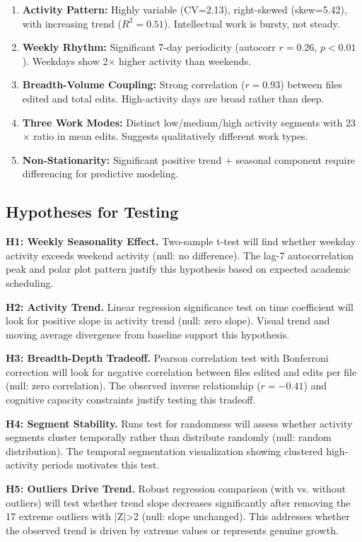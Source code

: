 \documentclass[11pt]{article}
\begin{document}
\begin{enumerate}
    \item \textbf{Activity Pattern:} Highly variable (CV=2.13), right-skewed (skew=5.42), with increasing trend ($R^2=0.51$). Intellectual work is bursty, not steady.
    \item \textbf{Weekly Rhythm:} Significant 7-day periodicity (autocorr $r=0.26$, $p<0.01$). Weekdays show 2$\times$ higher activity than weekends.
    \item \textbf{Breadth-Volume Coupling:} Strong correlation ($r=0.93$) between files edited and total edits. High-activity days are broad rather than deep.
    \item \textbf{Three Work Modes:} Distinct low/medium/high activity segments with 23$\times$ ratio in mean edits. Suggests qualitatively different work types.
    \item \textbf{Non-Stationarity:} Significant positive trend + seasonal component require differencing for predictive modeling.
\end{enumerate}

\subsection{Hypotheses for Testing}

\textbf{H1: Weekly Seasonality Effect.} Two-sample t-test will find whether weekday activity exceeds weekend activity (null: no difference). The lag-7 autocorrelation peak and polar plot pattern justify this hypothesis based on expected academic scheduling.

\textbf{H2: Activity Trend.} Linear regression significance test on time coefficient will look for positive slope in activity trend (null: zero slope). Visual trend and moving average divergence from baseline support this hypothesis.

\textbf{H3: Breadth-Depth Tradeoff.} Pearson correlation test with Bonferroni correction will look for negative correlation between files edited and edits per file (null: zero correlation). The observed inverse relationship ($r=-0.41$) and cognitive capacity constraints justify testing this tradeoff.

\textbf{H4: Segment Stability.} Runs test for randomness will assess whether activity segments cluster temporally rather than distribute randomly (null: random distribution). The temporal segmentation visualization showing clustered high-activity periods motivates this test.

\textbf{H5: Outliers Drive Trend.} Robust regression comparison (with vs. without outliers) will test whether trend slope decreases significantly after removing the 17 extreme outliers with |Z|>2 (null: slope unchanged). This addresses whether the observed trend is driven by extreme values or represents genuine growth.
\end{document}
